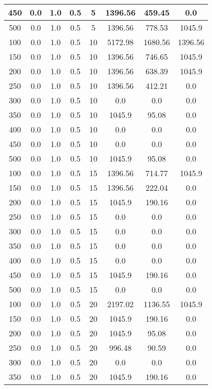 \documentclass[a4paper, 12pt]{extreport}
\begin{document}
\begin{itemize}
\begin{longtable}{|c|c|c|c|c|c|c|c|}
			450 & 0.0 & 1.0 & 0.5 & 5 & 1396.56 & 459.45 & 0.0 \\\hline
			500 & 0.0 & 1.0 & 0.5 & 5 & 1396.56 & 778.53 & 1045.9 \\\hline
			100 & 0.0 & 1.0 & 0.5 & 10 & 5172.98 & 1680.56 & 1396.56 \\\hline
			150 & 0.0 & 1.0 & 0.5 & 10 & 1396.56 & 746.65 & 1045.9 \\\hline
			200 & 0.0 & 1.0 & 0.5 & 10 & 1396.56 & 638.39 & 1045.9 \\\hline
			250 & 0.0 & 1.0 & 0.5 & 10 & 1396.56 & 412.21 & 0.0 \\\hline
			300 & 0.0 & 1.0 & 0.5 & 10 & 0.0 & 0.0 & 0.0 \\\hline
			350 & 0.0 & 1.0 & 0.5 & 10 & 1045.9 & 95.08 & 0.0 \\\hline
			400 & 0.0 & 1.0 & 0.5 & 10 & 0.0 & 0.0 & 0.0 \\\hline
			450 & 0.0 & 1.0 & 0.5 & 10 & 0.0 & 0.0 & 0.0 \\\hline
			500 & 0.0 & 1.0 & 0.5 & 10 & 1045.9 & 95.08 & 0.0 \\\hline
			100 & 0.0 & 1.0 & 0.5 & 15 & 1396.56 & 714.77 & 1045.9 \\\hline
			150 & 0.0 & 1.0 & 0.5 & 15 & 1396.56 & 222.04 & 0.0 \\\hline
			200 & 0.0 & 1.0 & 0.5 & 15 & 1045.9 & 190.16 & 0.0 \\\hline
			250 & 0.0 & 1.0 & 0.5 & 15 & 0.0 & 0.0 & 0.0 \\\hline
			300 & 0.0 & 1.0 & 0.5 & 15 & 0.0 & 0.0 & 0.0 \\\hline
			350 & 0.0 & 1.0 & 0.5 & 15 & 0.0 & 0.0 & 0.0 \\\hline
			400 & 0.0 & 1.0 & 0.5 & 15 & 0.0 & 0.0 & 0.0 \\\hline
			450 & 0.0 & 1.0 & 0.5 & 15 & 1045.9 & 190.16 & 0.0 \\\hline
			500 & 0.0 & 1.0 & 0.5 & 15 & 0.0 & 0.0 & 0.0 \\\hline
			100 & 0.0 & 1.0 & 0.5 & 20 & 2197.02 & 1136.55 & 1045.9 \\\hline
			150 & 0.0 & 1.0 & 0.5 & 20 & 1045.9 & 190.16 & 0.0 \\\hline
			200 & 0.0 & 1.0 & 0.5 & 20 & 1045.9 & 95.08 & 0.0 \\\hline
			250 & 0.0 & 1.0 & 0.5 & 20 & 996.48 & 90.59 & 0.0 \\\hline
			300 & 0.0 & 1.0 & 0.5 & 20 & 0.0 & 0.0 & 0.0 \\\hline
			350 & 0.0 & 1.0 & 0.5 & 20 & 1045.9 & 190.16 & 0.0 \\\hline

\end{longtable}
\end{itemize}
\end{document}
